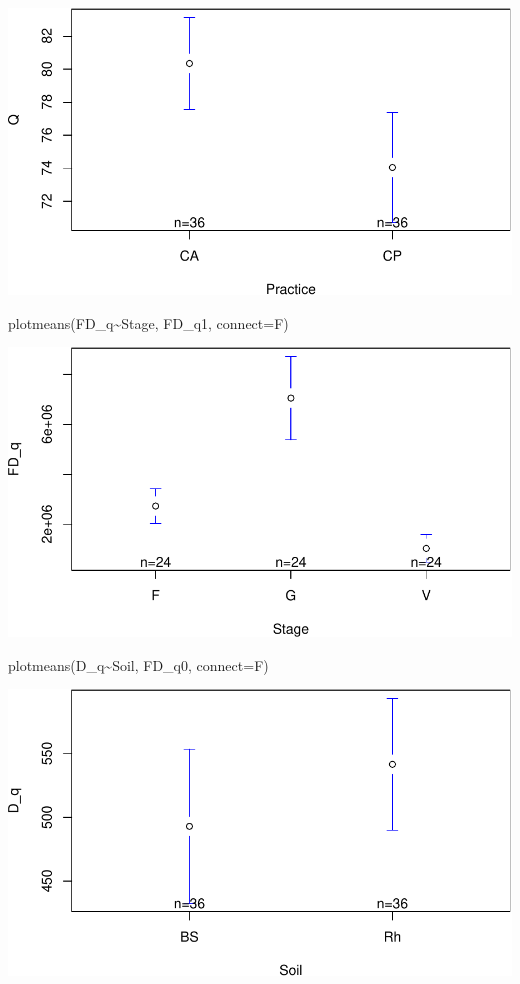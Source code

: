 \documentclass[]{interact}
\theoremstyle{plain}%
\theoremstyle{definition}
\theoremstyle{remark}
\newenvironment{Shaded}{\begin{snugshade}}{\end{snugshade}}
\newcommand{\AttributeTok}[1]{\textcolor[rgb]{0.77,0.63,0.00}{#1}}
\newcommand{\FunctionTok}[1]{\textcolor[rgb]{0.00,0.00,0.00}{#1}}
\newcommand{\NormalTok}[1]{#1}
\newcommand{\SpecialCharTok}[1]{\textcolor[rgb]{0.00,0.00,0.00}{#1}}
\begin{document}
\includegraphics{Doc_pdf_files/figure-latex/unnamed-chunk-12-4.pdf}

\begin{Shaded}
\begin{Highlighting}[]
\FunctionTok{plotmeans}\NormalTok{(FD\_q}\SpecialCharTok{\textasciitilde{}}\NormalTok{Stage, FD\_q1, }\AttributeTok{connect=}\NormalTok{F)}
\end{Highlighting}
\end{Shaded}

\includegraphics{Doc_pdf_files/figure-latex/unnamed-chunk-12-5.pdf}

\begin{Shaded}
\begin{Highlighting}[]
\FunctionTok{plotmeans}\NormalTok{(D\_q}\SpecialCharTok{\textasciitilde{}}\NormalTok{Soil, FD\_q0, }\AttributeTok{connect=}\NormalTok{F)}
\end{Highlighting}
\end{Shaded}

\includegraphics{Doc_pdf_files/figure-latex/unnamed-chunk-12-6.pdf}
\end{document}
